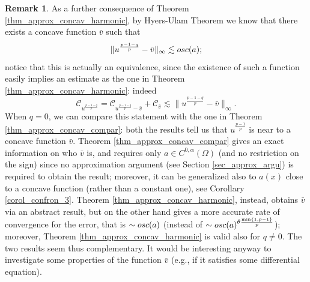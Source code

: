 \documentclass[11pt, reqno]{amsart}
\theoremstyle{definition}
\newtheorem{remark}[lemma]{Remark}
\numberwithin{equation}{section}
\newcommand{\mc}[1]{\mathcal{#1}}
\def\norm#1{\|#1\|}
\begin{document}
\begin{remark}
\label{rem_ulam_thm}
As a further consequence of Theorem \ref{thm_approx_concav_harmonic}, by Hyers-Ulam Theorem \cite{HyUl52} we know that there exists a concave function $\bar{v}$ such that 
\begin{equation}\label{eq_confr_exists_conca} 
\norm{u^{ \frac{p-1 - q}{p}} - \bar{v}}_{\infty} \lesssim \textup{osc}(a); 
\end{equation}
notice that this is actually an equivalence, since the existence of such a function easily implies an estimate as the one in Theorem \ref{thm_approx_concav_harmonic}: indeed 
$$\mc{C}_{u^{ \frac{p-1 - q}{p}}} =\mc{C}_{u^{ \frac{p-1 - q}{p}} - \bar{v}} + \mc{C}_{\bar{v}} \lesssim \norm{u^{ \frac{p-1 - q}{p}} - \bar{v}}_{\infty}.$$
When $q=0$, we can compare this statement with the one in Theorem \ref{thm_approx_concav_compar}: both the results tell us that $u^{\frac{p-1}{p}}$ is near to a concave function $\bar{v}$. Theorem \ref{thm_approx_concav_compar} gives an exact information on who $\bar{v}$ is, and requires only $a \in C^{0,\alpha}(\Omega)$ (and no restriction on the sign) since no approximation argument (see Section \ref{sec_approx_argu}) is required to obtain the result; moreover, it can be generalized also to $a(x)$ close to a concave function (rather than a constant one), see Corollary \ref{corol_confron_3}. 
Theorem \ref{thm_approx_concav_harmonic}, instead, obtains $\bar{v}$ via an abstract result, but on the other hand gives a more accurate rate of convergence for the error, that is $\sim \textup{osc}(a)$ (instead of $\sim \textup{osc}(a)^{\theta \frac{\min\{1,p-1\}}{p}}$); moreover, Theorem \ref{thm_approx_concav_harmonic} is valid also for $q \neq 0$. The two results seem thus complementary. 
It would be interesting anyway to investigate some properties of the function $\bar{v}$ (e.g., if it satisfies some differential equation).
\end{remark}
\end{document}
